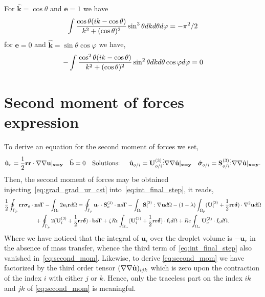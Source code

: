 For $\hat{\textbf{k}} = \cos\theta$ and $\textbf{e}=1$ we have
\begin{equation}
    \int \frac{\cos\theta (ik - \cos\theta)}{k^2 + (\cos\theta)^2}  \sin^3\theta dkd\theta d\varphi
     = - \pi^2 /2 \\
\end{equation}
for $\textbf{e}=0$ and $\hat{\textbf{k}}=\sin\theta \cos\varphi$ we have,
\begin{equation}
    -\int \frac{\cos^2\theta (ik - \cos\theta)}{k^2 + (\cos\theta)^2} \sin^2\theta   dkd\theta  \cos\varphi d\varphi
    = 0 \\
\end{equation}

\section{Second moment of forces expression}
\label{ap:second_mom}
To derive an equation for the second moment of forces we set,
\begin{align}
    \label{eq:grad_grad_ur_cst}
    \hat{\textbf{u}}_r =\frac{1}{2}\textbf{rr}\cdot  \grad\grad \textbf{u}|_{\textbf{x}=\textbf{y}}
    &&
    \hat{\textbf{b}} = 0 &&\text{Solutions: }
    &&
    \hat{\textbf{u}}_{o/i} = \textbf{U}_{o/i}^{(3)} \vdots \grad\grad\hat{\textbf{u}}|_{\textbf{x}=\textbf{y}}
    &&
    \hat{\bm\sigma}_{o/i} = \textbf{S}_{o/i}^{(3)} \vdots \grad\grad\hat{\textbf{u}}|_{\textbf{x}=\textbf{y}}.
\end{align}
Then, the second moment of forces may be obtained injecting~\ref{eq:grad_grad_ur_cst} into~\ref{eq:int_final_step}, it reads,
\begin{multline}
    \frac{1}{2}\intS[p]{\textbf{rr}  \bm\sigma_{o}\cdot \textbf{n}}
    - \intO[i]{2\textbf{e}_i \textbf{r}}
    =
    \intS[p]{\textbf{u}_{r}\cdot \textbf{S}^{(3)}_{o}\cdot \textbf{n}}
    - \intO[i]{\textbf{S}_i^{(3)} :\grad\textbf{u}}
    - (1-\lambda) \intO[p]{( \textbf{U}_{i}^{(3)} + \frac{1}{2} \textbf{rr}\bm\delta ) \cdot \grad^2 \textbf{u} }\\
    + \intS[p]{2( \textbf{U}_{i}^{(3)} + \frac{1}{2} \textbf{rr}\bm\delta ) \cdot  \textbf{b}}
    + \zeta Re \intO{( \textbf{U}_{i}^{(3)} + \frac{1}{2} \textbf{rr}\bm\delta )\cdot \textbf{f}_{i}}
    + Re\intO[o]{\textbf{U}_{o}^{(3)}\cdot \textbf{f}_{o}}.
    \label{eq:second_mom}
\end{multline}
Where we have noticed that the integral of $\textbf{u}_i$ over the droplet volume is $-\textbf{u}_r$ in the absence of mass transfer, whence the third term of~\ref{eq:int_final_step} also vanished in~\ref{eq:second_mom}.
Likewise, to derive \ref{eq:second_mom} we have factorized by the third order tensor $(\mathbf{\nabla}\mathbf{\nabla} \hat{\textbf{u}})_{ijk}$ which is zero upon the contraction of the index $i$ with either $j$ or $k$.
Hence, only the traceless part on the index $ik$ and $jk$ of \ref{eq:second_mom} is meaningful.

